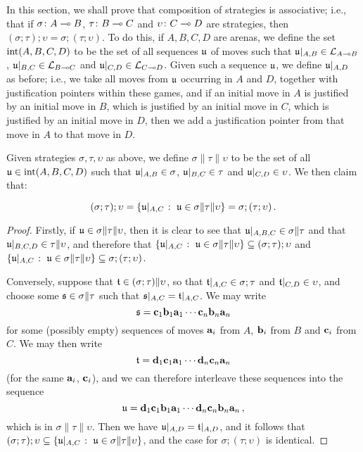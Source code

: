 \documentclass[11pt]{report}
\begin{document}
In this section, we shall prove that composition of strategies is associative; i.e., that if $\sigma\colon A \multimap B$, $\tau\colon B\multimap C$ and $\upsilon \colon C \multimap D$ are strategies, then $(\sigma;\tau);\upsilon=\sigma;(\tau;\upsilon)$.  
To do this, if $A,B,C,D$ are arenas, we define the set $\operatorname{int}(A,B,C,D)$ to be the set of all sequences $\mathfrak u$ of moves such that $\mathfrak u\vert_{A,B}\in \mathcal L_{A\multimap B}$, $\mathfrak u\vert_{B,C}\in \mathcal L_{B\multimap C}$ and $\mathfrak u\vert_{C,D}\in \mathcal L_{C \multimap D}$.  
Given such a sequence $\mathfrak u$, we define $\mathfrak u\vert_{A,D}$ as before; i.e., we take all moves from $\mathfrak u$ occurring in $A$ and $D$, together with justification pointers within these games, and if an initial move in $A$ is justified by an initial move in $B$, which is justified by an initial move in $C$, which is justified by an initial move in $D$, then we add a justification pointer from that move in $A$ to that move in $D$.

Given strategies $\sigma,\tau,\upsilon$ as above, we define $\sigma\|\tau\|\upsilon$ to be the set of all $\mathfrak u\in\operatorname{int}(A,B,C,D)$ such that $\mathfrak u\vert_{A,B}\in\sigma$, $\mathfrak u\vert_{B,C}\in\tau$ and $\mathfrak u\vert_{C,D}\in\upsilon$.
We then claim that:

\begin{lemma}
  \[
    (\sigma;\tau);\upsilon = \{\mathfrak u\vert_{A,C}\;\colon\; \mathfrak u\in\sigma\|\tau\|\upsilon\} = \sigma;(\tau;\upsilon)\,.
    \]
\end{lemma}
\begin{proof}
  Firstly, if $\mathfrak u\in\sigma\|\tau\|\upsilon$, then it is clear to see that $\mathfrak u\vert_{A,B,C}\in\sigma\|\tau$ and that $\mathfrak u\vert_{B,C,D}\in\tau\|\upsilon$, and therefore that $\{\mathfrak u\vert_{A,C}\;\colon\; \mathfrak u\in\sigma\|\tau\|\upsilon\}\subseteq (\sigma;\tau);\upsilon$ and $\{\mathfrak u\vert_{A,C}\;\colon\; \mathfrak u\in\sigma\|\tau\|\upsilon\}\subseteq \sigma;(\tau;\upsilon)$. 

  Conversely, suppose that $\mathfrak t\in(\sigma;\tau)\|\upsilon$, so that $\mathfrak t\vert_{A,C}\in\sigma;\tau$ and $\mathfrak t\vert_{C,D}\in\upsilon$, and choose some $\mathfrak s\in\sigma\|\tau$ such that $\mathfrak s\vert_{A,C}=\mathfrak t\vert_{A,C}$.
  We may write 
  \[
    \mathfrak s=\mathbf{c}_1\mathbf{b}_1\mathbf{a}_1\cdots \mathbf{c}_n\mathbf{b}_n\mathbf{a}_n
    \]
  for some (possibly empty) sequences of moves $\mathbf{a}_i$ from $A$, $\mathbf{b}_i$ from $B$ and $\mathbf{c}_i$ from $C$.  
  We may then write 
  \[
    \mathfrak t=\mathbf{d}_1\mathbf{c}_1\mathbf{a}_1\cdots\mathbf{d}_n\mathbf{c}_n\mathbf{a}_n
    \]
  (for the same $\mathbf{a}_i$, $\mathbf{c}_i$), and we can therefore interleave these sequences into the sequence
  \[
    \mathfrak u = \mathbf{d}_1\mathbf{c}_1\mathbf{b}_1\mathbf{a}_1\cdots\mathbf{d}_n\mathbf{c}_n\mathbf{b}_n\mathbf{a}_n\,,
    \]
  which is in $\sigma\|\tau\|\upsilon$.
  Then we have $\mathfrak u\vert_{A,D}=\mathfrak t\vert_{A,D}$, and it follows that $(\sigma;\tau);\upsilon\subseteq\{\mathfrak u\vert_{A,C}\;\colon\; \mathfrak u\in\sigma\|\tau\|\upsilon\}$, and the case for $\sigma;(\tau;\upsilon)$ is identical.
\end{proof}
\end{document}
